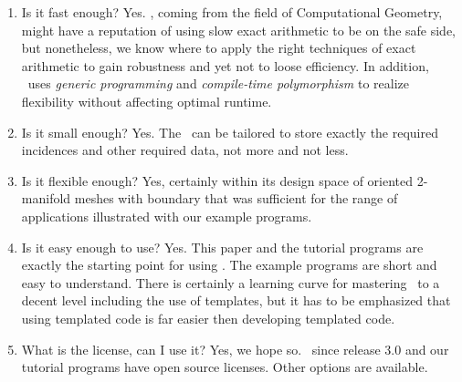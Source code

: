 \begin{enumerate}
  \item
    Is it fast enough? Yes. \cgal, coming from the field of Computational
    Geometry, might have a reputation of using slow exact arithmetic
    to be on the safe side, but nonetheless, we know where to apply
    the right techniques of exact arithmetic to gain robustness and
    yet not to loose efficiency. In addition, \cgal\ uses
    \emph{generic programming\/} and \emph{compile-time
    polymorphism\/} to realize flexibility without affecting optimal
    runtime.
  \item
    Is it small enough? Yes. The \cgalpoly\ can be tailored to store
    exactly the required incidences and other required data, not more and
    not less. %
  \item
    Is it flexible enough? Yes, certainly within its design
    space of oriented 2-manifold meshes with boundary that was
    sufficient for the range of applications illustrated with our
    example programs. 
  \item
    Is it easy enough to use? Yes. This paper and the tutorial
    programs are exactly the starting point for using \cgalpoly. The
    example programs are short and easy to understand. There is
    certainly a learning curve for mastering \CC\ to a decent level
    including the use of templates, but it has to be emphasized that
    using templated code is far easier then developing templated code.
  \item
    What is the license, can I use it? Yes, we hope so. \cgal\ since
    release 3.0 and our tutorial programs have open source
    licenses. Other options are available.
\end{enumerate}

